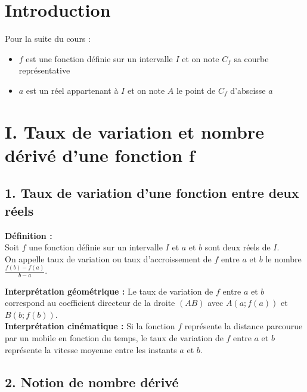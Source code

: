 \documentclass[11pt,a4paper]{article}
\title{\titre}
\author{\classe \\ \theme}
\date{}
\begin{document}
\maketitle
\pagestyle{custom}
\thispagestyle{custom}

\section*{Introduction}

Pour la suite du cours :
\begin{itemize}
    \item $f$ est une fonction définie sur un intervalle $I$ et on note $C_f$ sa courbe représentative
    \item $a$ est un réel appartenant à $I$ et on note $A$ le point de $C_f$ d'abscisse $a$
\end{itemize}

\section*{I. Taux de variation et nombre dérivé d'une fonction $\boldsymbol{f}$}
\subsection*{1. Taux de variation d'une fonction entre deux réels}

\begin{mdframed}[style=definitionStyle]
    \textbf{Définition :} ~\\
    Soit $f$ une fonction définie sur un intervalle $I$ et $a$ et $b$ sont deux réels de $I$. ~\\
    On appelle taux de variation ou taux d'accroissement de $f$ entre $a$ et $b$ le nombre $\displaystyle{\frac{f(b)-f(a)}{b-a}}$.
\end{mdframed}

\textbf{Interprétation géométrique :} Le taux de variation de $f$ entre $a$ et $b$ correspond au coefficient directeur
de la droite $(AB)$ avec $A(a; f(a))$ et $B(b; f(b))$. \\

\textbf{Interprétation cinématique :} Si la fonction $f$ représente la distance parcourue par un mobile en fonction du temps, le taux de variation de $f$ entre $a$ et $b$ représente la vitesse moyenne entre les instants $a$ et $b$.

\subsection*{2. Notion de nombre dérivé}
\end{document}

